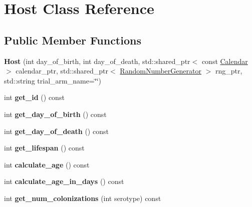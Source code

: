 \hypertarget{class_host}{}\section{Host Class Reference}
\label{class_host}
\subsection*{Public Member Functions}
\begin{DoxyCompactItemize}
\item 
\mbox{\label{class_host_a7e63fd0bd3641d2ce7ccc18926904a65}} 
{\bfseries Host} (int day\+\_\+of\+\_\+birth, int day\+\_\+of\+\_\+death, std\+::shared\+\_\+ptr$<$ const \hyperlink{class_calendar}{Calendar} $>$ calendar\+\_\+ptr, std\+::shared\+\_\+ptr$<$ \hyperlink{class_random_number_generator}{Random\+Number\+Generator} $>$ rng\+\_\+ptr, std\+::string trial\+\_\+arm\+\_\+name=\char`\"{}\char`\"{})
\item 
\mbox{\label{class_host_abfc1d181c7ca77884210c4f1595374e2}} 
int {\bfseries get\+\_\+id} () const
\item 
\mbox{\label{class_host_ac1b050c046bfdbf72ec4baa17ee88ca8}} 
int {\bfseries get\+\_\+day\+\_\+of\+\_\+birth} () const
\item 
\mbox{\label{class_host_ab655243bf3c03ce6ce912f3f29034548}} 
int {\bfseries get\+\_\+day\+\_\+of\+\_\+death} () const
\item 
\mbox{\label{class_host_afd34881bf53b24e94f615580d482222f}} 
int {\bfseries get\+\_\+lifespan} () const
\item 
\mbox{\label{class_host_a356b8fac382aab0302d55b626f7647eb}} 
int {\bfseries calculate\+\_\+age} () const
\item 
\mbox{\label{class_host_a7121157557cc392690042fcefd7e79bb}} 
int {\bfseries calculate\+\_\+age\+\_\+in\+\_\+days} () const
\item 
\mbox{\label{class_host_a1b90e4faeded137c0b4d75fde86c21e9}} 
int {\bfseries get\+\_\+num\+\_\+colonizations} (int serotype) const
\item 

\end{DoxyCompactItemize}
